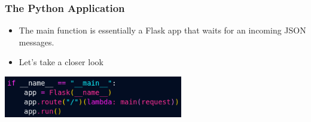 \documentclass[aspectratio=169]{beamer}
\begin{document}
\begin{frame}
	\frametitle{The Python Application}

	\begin{itemize}
		\item The main function is essentially a Flask app that waits for an incoming JSON messages.
		\item Let's take a closer look
	\end{itemize}
	\begin{center}
		\includegraphics[width=0.585\textwidth]{../images/main-function-py.png}
	\end{center}

\end{frame}
\end{document}
